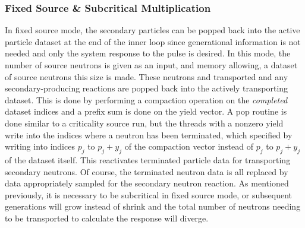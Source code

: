 \subsubsection{Fixed Source \& Subcritical Multiplication}

In fixed source mode, the secondary particles can be popped back into the active particle dataset at the end of the inner loop since generational information is not needed and only the system response to the pulse is desired.  In this mode, the number of source neutrons is given as an input, and memory allowing, a dataset of source neutrons this size is made.  These neutrons and transported and any secondary-producing reactions are popped back into the actively transporting dataset.  This is done by performing a compaction operation on the \emph{completed} dataset indices and a prefix sum is done on the yield vector.  A pop routine is done similar to a criticality source run, but the threads with a nonzero yield write into the indices where a neutron has been terminated, which specified by writing into indices $p_j$ to $p_j+y_j$ of the compaction vector instead of $p_j$ to $p_j+y_j$ of the dataset itself.  This reactivates terminated particle data for transporting secondary neutrons.  Of course, the terminated neutron data is all replaced by data appropriately sampled for the secondary neutron reaction.  As mentioned previously, it is necessary to be subcritical in fixed source mode, or subsequent generations will grow instead of shrink and the total number of neutrons needing to be transported to calculate the response will diverge.


